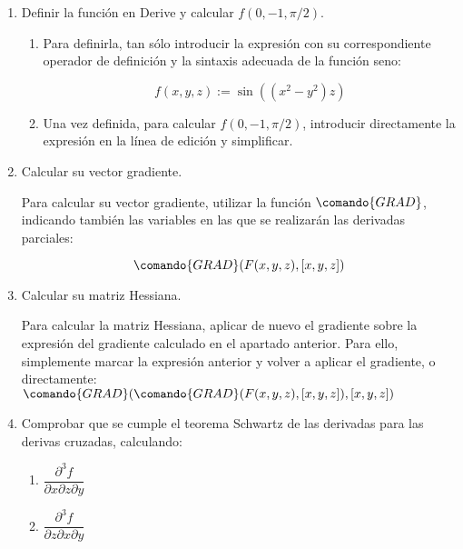 \begin{enumerate}[leftmargin=*]
\begin{enumerate}
\item Definir la función en Derive y calcular $f(0,-1,\pi/2)$.


\begin{indicacion}
{
\begin{enumerate}

\item Para definirla, tan sólo introducir la expresión con su
correspondiente operador de definición y la sintaxis adecuada de la
función seno:

\[
f(x,y,z):=\sin((x^2-y^2)z)
\]

\item Una vez definida, para calcular $f(0,-1,\pi/2)$, introducir
directamente la expresión en la línea de edición y simplificar.

\end{enumerate}
}
\end{indicacion}

\item Calcular su vector gradiente.

\begin{indicacion}
{Para calcular su vector gradiente, utilizar la función
$\comando{GRAD}$, indicando también las variables en las que se
realizarán las derivadas parciales:

\[
\comando{GRAD}(F(x,y,z), [x,y,z])
\]

}
\end{indicacion}

\item Calcular su matriz Hessiana.

\begin{indicacion}
{Para calcular la matriz Hessiana, aplicar de nuevo el gradiente
sobre la expresión del gradiente calculado en el apartado anterior.
Para ello, simplemente marcar la expresión anterior y volver a
aplicar el gradiente, o directamente:
$\comando{GRAD}(\comando{GRAD}(F(x,y,z),[x,y,z]),[x,y,z])$

}
\end{indicacion}

\item Comprobar que se cumple el teorema Schwartz de las derivadas
para las derivas cruzadas, calculando:

\begin{enumerate}

\item $\dfrac{{\partial ^3 f}} {{\partial x\partial z\partial y}}$

\item $\dfrac{{\partial ^3 f}} {{\partial z\partial x\partial y}}$


\end{enumerate}
\end{enumerate}
\end{enumerate}
